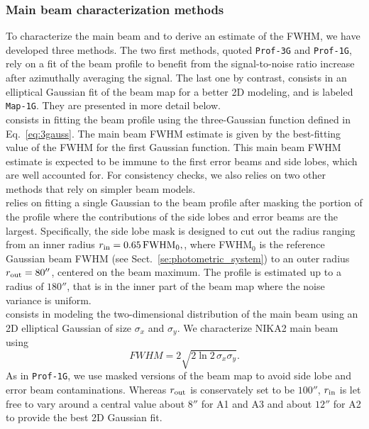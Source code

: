 \subsubsection{Main beam characterization methods}
\label{se:mainbeam_methods}
To characterize the main beam and to derive an estimate of the FWHM, we
have developed three methods. The two first methods, quoted
{\tt Prof-3G} and {\tt Prof-1G}, rely on a fit of the beam profile to
benefit from the signal-to-noise ratio increase after azimuthally
averaging the signal. The last one by contrast,
consists in an elliptical Gaussian fit of the beam map for a better
2D modeling, and is labeled {\tt Map-1G}. They are presented in more
detail below. \\

 consists in fitting the beam profile using the
three-Gaussian function defined in Eq.~\ref{eq:3gauss}.
 The main beam FWHM estimate is given by the best-fitting value
of the FWHM for the first Gaussian function. {\lp This main beam FWHM
estimate is expected to be immune to the first error beams
and side lobes, which are well accounted for. For consistency checks,
we also relies on two other methods that rely on simpler beam models.}\\

 relies on fitting a single Gaussian to the beam
profile after masking the portion of the profile where the
contributions of the side lobes and error beams are the
largest. Specifically, the side lobe mask is designed to cut out {\lp the
radius ranging from an inner radius
$r_{\rm{in}} = 0.65\, \mathrm{FWHM}_0,$, where FWHM$_0$ is the
reference Gaussian beam FWHM (see Sect.~\ref{se:photometric_system})
to an outer radius $r_{\rm{out}} = 80''$,} centered on the beam
maximum.
The profile is estimated up to a radius of
$180''$, that is in the inner part of the beam map where the noise
variance is uniform.\\

 consists in modeling the two-dimensional distribution of
the main beam using an 2D elliptical Gaussian of size $\sigma_x$ and
$\sigma_y$. We characterize NIKA2 main beam using
\begin{equation}
  FWHM = 2 \sqrt{2\ln {2}\, \sigma_x\sigma_y}.
  \label{eq:fwhm_geom}
\end{equation}
As in {\tt Prof-1G}, we use masked versions of the
beam map to avoid side lobe and error beam contaminations. 
Whereas $r_{\rm{out}}$ is conservately set to be $100''$,
$r_{\rm{in}}$ is let free to vary around a central value about $8''$
for A1 and A3 and about $12''$ for A2 to provide the best 2D Gaussian
fit.

